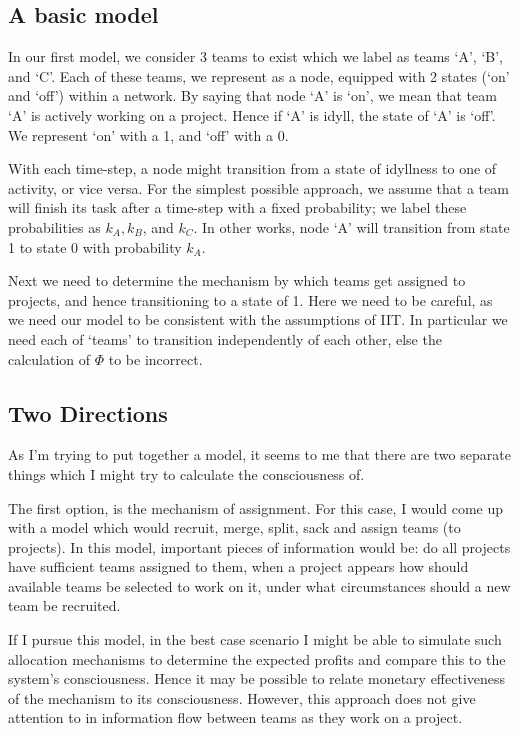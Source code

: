 \subsection{A basic model}
In our first model, we consider 3 teams to exist which we label as teams `A', `B', and `C'. Each of these teams, we represent as a node, equipped with 2 states (`on' and `off') within a network. By saying that node `A' is `on', we mean that team `A' is actively working on a project. Hence if `A' is idyll, the state of `A' is `off'. We represent `on' with a 1, and `off' with a 0.

With each time-step, a node might transition from a state of idyllness to one of activity, or vice versa. For the simplest possible approach, we assume that a team will finish its task after a time-step with a fixed probability; we label these probabilities as $k_A, k_B$, and $k_C$. In other works, node `A' will transition from state 1 to state 0 with probability $k_A$.

Next we need to determine the mechanism by which teams get assigned to projects, and hence transitioning to a state of 1. Here we need to be careful, as we need our model to be consistent with the assumptions of IIT. In particular we need each of `teams' to transition independently of each other, else the calculation of $\Phi$ to be incorrect. 



\iffalse
\subsection{Two Directions}
As I'm trying to put together a model, it seems to me that there are two separate things which I might try to calculate the consciousness of. 

The first option, is the mechanism of assignment. For this case, I would come up with a model which would recruit, merge, split, sack and assign teams (to projects). In this model, important pieces of information would be: do all projects have sufficient teams assigned to them, when a project appears how should available teams be selected to work on it, under what circumstances should a new team be recruited. 

If I pursue this model, in the best case scenario I might be able to simulate such allocation mechanisms to determine the expected profits and compare this to the system's consciousness. Hence it may be possible to relate monetary effectiveness of the mechanism to its consciousness. However, this approach does not give attention to in information flow between teams as they work on a project. 

